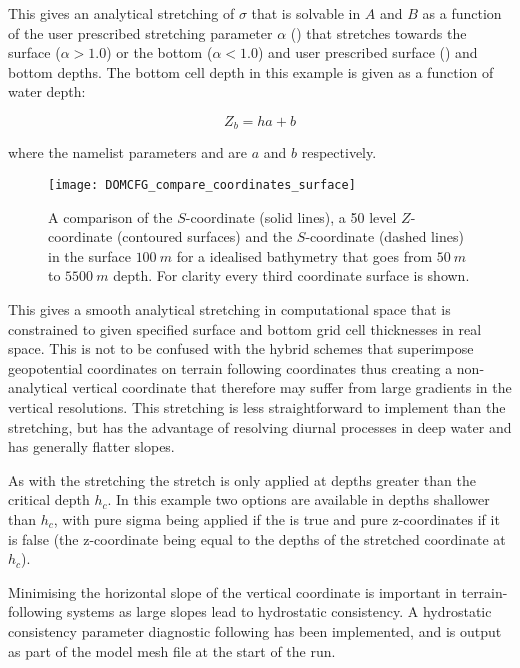 \documentclass[../main/NEMO_manual]{subfiles}
\begin{document}
This gives an analytical stretching of $\sigma$ that is solvable in $A$ and $B$ as a function of
the user prescribed stretching parameter $\alpha$ () that stretches towards
the surface ($\alpha > 1.0$) or the bottom ($\alpha < 1.0$) and
user prescribed surface () and bottom depths.
The bottom cell depth in this example is given as a function of water depth:

\[
  Z_b = h a + b
\]

where the namelist parameters  and  are $a$ and $b$ respectively.

\begin{figure}[!ht]
  \centering
  \texttt{[image: DOMCFG\_compare\_coordinates\_surface]}
  \caption[DOMAINcfg: comparison of $s$- and $z$-coordinate]{
    A comparison of the \citet{song.haidvogel_JCP94} $S$-coordinate (solid lines),
    a 50 level $Z$-coordinate (contoured surfaces) and
    the \citet{siddorn.furner_OM13} $S$-coordinate (dashed lines) in the surface $100~m$ for
    a idealised bathymetry that goes from $50~m$ to $5500~m$ depth.
    For clarity every third coordinate surface is shown.}
  \label{fig:DOMCFG_fig_compare_coordinates_surface}
\end{figure}

This gives a smooth analytical stretching in computational space that is constrained to
given specified surface and bottom grid cell thicknesses in real space.
This is not to be confused with the hybrid schemes that
superimpose geopotential coordinates on terrain following coordinates thus
creating a non-analytical vertical coordinate that
therefore may suffer from large gradients in the vertical resolutions.
This stretching is less straightforward to implement than the \citet{song.haidvogel_JCP94} stretching,
but has the advantage of resolving diurnal processes in deep water and has generally flatter slopes.

As with the \citet{song.haidvogel_JCP94} stretching the stretch is only applied at depths greater than
the critical depth $h_c$.
In this example two options are available in depths shallower than $h_c$,
with pure sigma being applied if the  is true and pure z-coordinates if it is false
(the z-coordinate being equal to the depths of the stretched coordinate at $h_c$).

Minimising the horizontal slope of the vertical coordinate is important in terrain-following systems as
large slopes lead to hydrostatic consistency.
A hydrostatic consistency parameter diagnostic following \citet{haney_JPO91} has been implemented,
and is output as part of the model mesh file at the start of the run.
\end{document}
